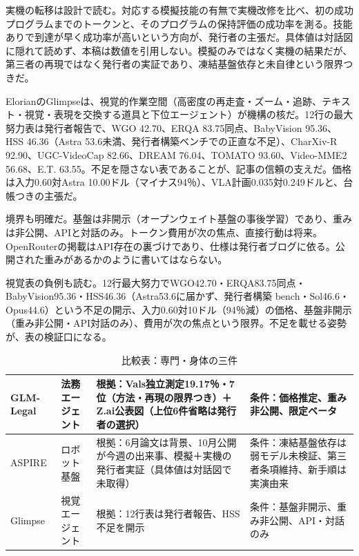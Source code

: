 \documentclass[lualatex,a4paper,10pt]{jlreq}
\begin{document}
実機の転移は設計で読む。対応する模擬技能の有無で実機改修を比べ、初の成功プログラムまでのトークンと、そのプログラムの保持評価の成功率を測る。技能ありで到達が早く成功率が高いという方向が、発行者の主張だ。具体値は対話図に隠れて読めず、本稿は数値を引用しない。模擬のみではなく実機の結果だが、第三者の再現ではなく発行者の実証であり、凍結基盤依存と未自律という限界つきだ。
\cite{B57,B56,B89}


ElorianのGlimpseは、視覚的作業空間（高密度の再走査・ズーム・追跡、テキスト・視覚・表現を交換する道具と下位エージェント）が機構の核だ。12行の最大努力表は発行者報告で、WGO 42.70、ERQA 83.75同点、BabyVision 95.36、HSS 46.36（Astra 53.6未満、発行者構築ベンチでの正直な不足）、CharXiv-R 92.90、UGC-VideoCap 82.66、DREAM 76.04、TOMATO 93.60、Video-MME2 56.68、E.T. 63.55。不足を隠さない表であることが、記事の信頼の支えだ。価格は入力0.60対Astra 10.00ドル（マイナス94％）、VLA計画0.035対0.249ドルと、台帳つきの主張だ。
\cite{B58,B59,B88}


境界も明確だ。基盤は非開示（オープンウェイト基盤の事後学習）であり、重みは非公開、APIと対話のみ。トークン費用が次の焦点、直接行動は将来。OpenRouterの掲載はAPI存在の裏づけであり、仕様は発行者ブログに依る。公開された重みがあるかのように書いてはならない。
\cite{B58,B59,B88}


視覚表の負例も読む。12行最大努力でWGO42.70・ERQA83.75同点・BabyVision95.36・HSS46.36（Astra53.6に届かず、発行者構築 bench・Sol46.6・Opus44.6）という不足の開示、入力0.60対10ドル（94％減）の価格、基盤非開示（重み非公開・API対話のみ）、費用が次の焦点という限界。不足を載せる姿勢が、表の検証口になる。
\cite{B58,B59,B88}


\begin{table}[htbp]\centering\footnotesize
\caption{比較表：専門・身体の三件}
\begin{tabularx}{0.96\linewidth}{@{}lXXX@{}}
\toprule
GLM-Legal & 法務エージェント & 根拠：Vals独立測定19.17％・7位（方法・再現の限界つき）＋Z.ai公表図（上位6件省略は発行者の選択） & 条件：価格推定、重み非公開、限定ベータ \cite{B55,B53,B54} \\
\midrule
ASPIRE & ロボット基盤 & 根拠：6月論文は背景、10月公開が今週の出来事、模擬＋実機の発行者実証（具体値は対話図で未取得） & 条件：凍結基盤依存は弱モデル未検証、第三者条項維持、新手順は実演由来 \cite{B57,B56,B89} \\
\midrule
Glimpse & 視覚エージェント & 根拠：12行表は発行者報告、HSS不足を開示 & 条件：基盤非開示、重み非公開、API・対話のみ \cite{B58,B59,B88} \\
\bottomrule
\end{tabularx}
\end{table}
\end{document}
